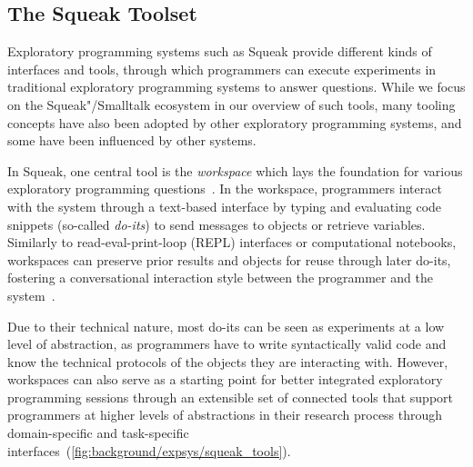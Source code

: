 \subsection*[The Squeak Toolset]{%
	The Squeak Toolset
	\hfill
}
\label{sec:background/expsys/tools}

Exploratory programming systems such as Squeak provide different kinds of interfaces and tools, through which programmers can execute experiments in traditional exploratory programming systems to answer questions.
While we focus on the Squeak"/Smalltalk ecosystem in our overview of such tools, many tooling concepts have also been adopted by other exploratory programming systems, and some have been influenced by other systems.

In Squeak, one central tool is the \emph{workspace} which lays the foundation for various exploratory programming questions~\cites[chap.~6]{goldberg1984smalltalk}[sec.~1.4]{thiede2023squeak}.
In the workspace, programmers interact with the system through a text-based interface by typing and evaluating code snippets (so-called \emph{do-its}) to send messages to objects or retrieve variables.
Similarly to read-eval-print-loop (REPL) interfaces or computational notebooks, workspaces can preserve prior results and objects for reuse through later do-its, fostering a conversational interaction style between the programmer and the system~\cite{taeumel2022pattern}.

Due to their technical nature, most do-its can be seen as experiments at a low level of abstraction, as programmers have to write syntactically valid code and know the technical protocols of the objects they are interacting with.
However, workspaces can also serve as a starting point for better integrated exploratory programming sessions through an extensible set of connected tools that support programmers at higher levels of abstractions in their research process through domain-specific and task-specific interfaces~(\cref{fig:background/expsys/squeak_tools}).

